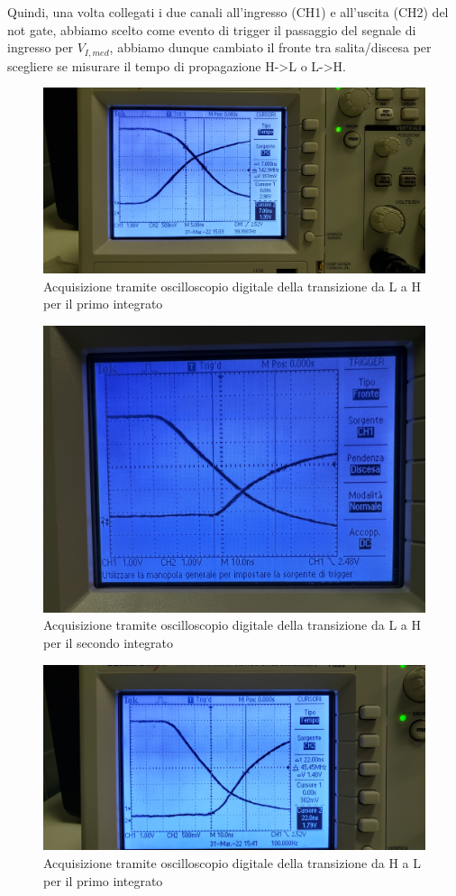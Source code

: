 \documentclass[10pt, a4paper, italian]{article}
\begin{document}
Quindi, una volta collegati i due canali all'ingresso (CH1) e all'uscita (CH2)
del not gate, abbiamo scelto come evento di trigger il passaggio del segnale
di ingresso per $V_{I,med}$, abbiamo dunque cambiato il fronte tra
salita/discesa per scegliere se misurare il tempo di propagazione H->L o L->H.
\begin{figure}[htbp]
\centering
	\includegraphics[width=\textwidth]{LH1}
	\caption{Acquisizione tramite oscilloscopio digitale della transizione da
	L a H per il primo integrato}
\end{figure}
\begin{figure}[htbp]
\centering
	\includegraphics[width=\textwidth]{LH2}
	\caption{Acquisizione tramite oscilloscopio digitale della transizione da
	L a H per il secondo integrato}
\end{figure}
\begin{figure}[htbp]
\centering
	\includegraphics[width=\textwidth]{HL1}
	\caption{Acquisizione tramite oscilloscopio digitale della transizione da
	H a L per il primo integrato}
\end{figure}
\end{document}

